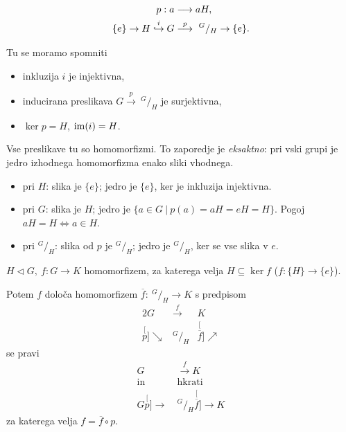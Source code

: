\begin{align}
	p : a &\longrightarrow aH, \notag \\
	\{e\} \to H \stackrel{i}{\hookrightarrow} G &\stackrel{p}{\longrightarrow}\ ^G/_H \to \{e\}.
\end{align}

\ni Tu se moramo spomniti
\begin{itemize}
	\item{inkluzija $i$ je injektivna,}
	\item{inducirana preslikava $G \stackrel{p}{\to}\ ^G/_H$ je surjektivna,}
	\item{$\ker p = H$, $\operatorname{im}(i) = H$.}
\end{itemize}

\ni Vse preslikave tu so homomorfizmi. To zaporedje je \emph{eksaktno}: pri vski grupi je jedro izhodnega
homomorfizma enako sliki vhodnega.
\begin{itemize}
	\item{pri $H$: slika je $\{e\}$; jedro je $\{e\}$, ker je inkluzija injektivna.}
	\item{pri $G$: slika je $H$; jedro je $\{a \in G\ |\ p(a) = aH = eH = H\}$. Pogoj $aH = H \iff a \in H$.}
	\item{pri $^G/_H$: slika od $p$ je $^G/_H$; jedro je $^G/_H$, ker se vse slika v $e$.}
\end{itemize}

\begin{trditev}
	$H \lhd G,\ f : G \to K$ homomorfizem, za katerega velja $H \subseteq \ker f$ ($f : \{H\} \to \{e\}$).
	
	\ni Potem $f$ dolo\v ca homomorfizem $\overline{f} :\ ^G/_H \to K$ s predpisom
	\begin{alignat*}{2}
		G &\stackrel{f}{\longrightarrow} &K \\
		\stackrel[p]{}{\searrow} &^G/_H &\stackrel[\overline{f}]{}{\nearrow}
	\end{alignat*}
	se pravi
	\begin{align*}
		G &\stackrel{f}{\to} K \\
		\text{in}\ &\text{hkrati} \\
		G \stackrel[p]{}{\to}\ &^G/_H \stackrel[\overline{f}]{}{\to} K
	\end{align*}
	za katerega velja $f = \overline{f}\circ p$.
\end{trditev}

